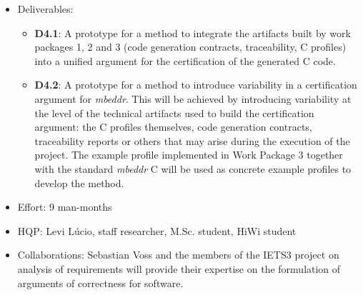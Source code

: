 \begin{itemize}
  \item Deliverables:
  \begin{itemize}
    \item{\textbf{D4.1}:} A prototype for a method to integrate the artifacts
    built by work packages 1, 2 and 3 (code generation contracts, traceability, C profiles)
    into a unified argument for the certification of the generated C code.
\item{\textbf{D4.2}:} A prototype for a method to introduce variability in a
certification argument for \emph{mbeddr}. This will be achieved by introducing variability at
the level of the technical artifacts used to build the certification argument:
the C profiles themselves, code generation contracts, traceability reports or
others that may arise during the execution of the project. The example profile implemented in
Work Package 3 together with the standard \emph{mbeddr} C will be used as
concrete example profiles to develop the method.
  \end{itemize}
  \item Effort: 9 man-months
  \item HQP: Levi L\'ucio, staff researcher, M.Sc. student, HiWi student 
  \item Collaborations: Sebastian Voss and the members of the IETS3 project on
  analysis of requirements will provide their expertise on the formulation of
  arguments of correctness for software.
\end{itemize}